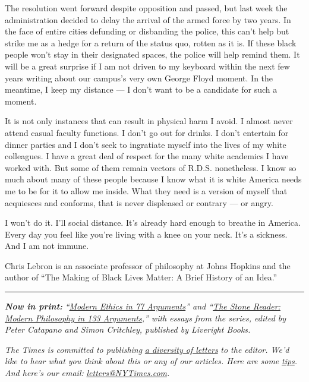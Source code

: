 The resolution went forward despite opposition and passed, but last week
the administration decided to delay the arrival of the armed force by
two years. In the face of entire cities defunding or disbanding the
police, this can't help but strike me as a hedge for a return of the
status quo, rotten as it is. If these black people won't stay in their
designated spaces, the police will help remind them. It will be a great
surprise if I am not driven to my keyboard within the next few years
writing about our campus's very own George Floyd moment. In the
meantime, I keep my distance --- I don't want to be a candidate for such
a moment.

It is not only instances that can result in physical harm I avoid. I
almost never attend casual faculty functions. I don't go out for drinks.
I don't entertain for dinner parties and I don't seek to ingratiate
myself into the lives of my white colleagues. I have a great deal of
respect for the many white academics I have worked with. But some of
them remain vectors of R.D.S. nonetheless. I know so much about many of
these people because I know what it is white America needs me to be for
it to allow me inside. What they need is a version of myself that
acquiesces and conforms, that is never displeased or contrary --- or
angry.

I won't do it. I'll social distance. It's already hard enough to breathe
in America. Every day you feel like you're living with a knee on your
neck. It's a sickness. And I am not immune.

Chris Lebron is an associate professor of philosophy at Johns Hopkins
and the author of ``The Making of Black Lives Matter: A Brief History of
an Idea.''

\begin{center}\rule{0.5\linewidth}{\linethickness}\end{center}

\emph{\textbf{Now in print:}}
\emph{``}\href{http://bitly.com/1MW2kN3}{\emph{Modern Ethics in 77
Arguments}}\emph{'' and ``}\href{http://bitly.com/1MW2kN3}{\emph{The
Stone Reader: Modern Philosophy in 133 Arguments}}\emph{,'' with essays
from the series, edited by Peter Catapano and Simon Critchley, published
by Liveright Books.}

\emph{The Times is committed to publishing}
\href{https://www.nytimes3xbfgragh.onion/2019/01/31/opinion/letters/letters-to-editor-new-york-times-women.html}{\emph{a
diversity of letters}} \emph{to the editor. We'd like to hear what you
think about this or any of our articles. Here are some}
\href{https://help.nytimes3xbfgragh.onion/hc/en-us/articles/115014925288-How-to-submit-a-letter-to-the-editor}{\emph{tips}}\emph{.
And here's our email:}
\href{mailto:letters@NYTimes.com}{\emph{letters@NYTimes.com}}\emph{.}

